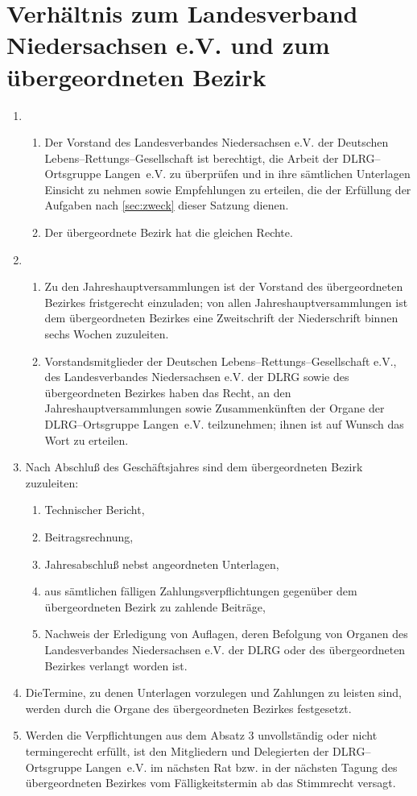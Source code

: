 \documentclass[%
12pt, %
a4paper, %
headsepline, %
footsepline, %
parskip, %
headings=normal, %
]{scrartcl}
\begin{document}
\section{Verhältnis zum Landesverband Niedersachsen e.V. und zum übergeordneten Bezirk}
\label{sec:verhaeltnis}
\begin{enumerate}
    \item \begin{enumerate}[noitemsep]
        \item Der Vorstand des Landesverbandes Niedersachsen e.V. der Deutschen Lebens--Rettungs--Gesellschaft ist berechtigt, die Arbeit der DLRG--Ortsgruppe Langen~e.V. zu überprüfen und in ihre sämtlichen Unterlagen Einsicht zu nehmen sowie Empfehlungen zu erteilen, die der Erfüllung der Aufgaben nach \ref{sec:zweck} dieser Satzung dienen.
        \item Der übergeordnete Bezirk hat die gleichen Rechte.
      \end{enumerate}
    \item \begin{enumerate}[noitemsep]
        \item Zu den Jahreshauptversammlungen ist der Vorstand des übergeordneten Bezirkes fristgerecht einzuladen; von allen Jahreshauptversammlungen ist dem übergeordneten Bezirkes eine Zweitschrift der Niederschrift binnen sechs Wochen zuzuleiten.
        \item Vorstandsmitglieder der Deutschen Lebens--Rettungs--Gesellschaft e.V., des Landesverbandes Niedersachsen e.V. der DLRG sowie des übergeordneten Bezirkes haben das Recht, an den Jahreshauptversammlungen sowie Zusammenkünften der Organe der DLRG--Ortsgruppe Langen~e.V. teilzunehmen; ihnen ist auf Wunsch das Wort zu erteilen.
      \end{enumerate}
    \item Nach Abschluß des Geschäftsjahres sind dem übergeordneten Bezirk zuzuleiten: \begin{enumerate}[noitemsep]
        \item Technischer Bericht,
        \item Beitragsrechnung,
        \item Jahresabschluß nebst angeordneten Unterlagen,
        \item aus sämtlichen fälligen Zahlungsverpflichtungen gegenüber dem übergeordneten Bezirk zu zahlende Beiträge,
        \item Nachweis der Erledigung von Auflagen, deren Befolgung von Organen des Landesverbandes Niedersachsen e.V. der DLRG oder des übergeordneten Bezirkes verlangt worden ist.
      \end{enumerate}
    \item DieTermine, zu denen Unterlagen vorzulegen und Zahlungen zu leisten sind, werden durch die Organe des übergeordneten Bezirkes festgesetzt.
    \item Werden die Verpflichtungen aus dem Absatz 3 unvollständig oder nicht termingerecht erfüllt, ist den Mitgliedern und Delegierten der DLRG--Ortsgruppe Langen~e.V. im nächsten Rat bzw. in der nächsten Tagung des übergeordneten Bezirkes vom Fälligkeitstermin ab das Stimmrecht versagt.
\end{enumerate}
\end{document}
